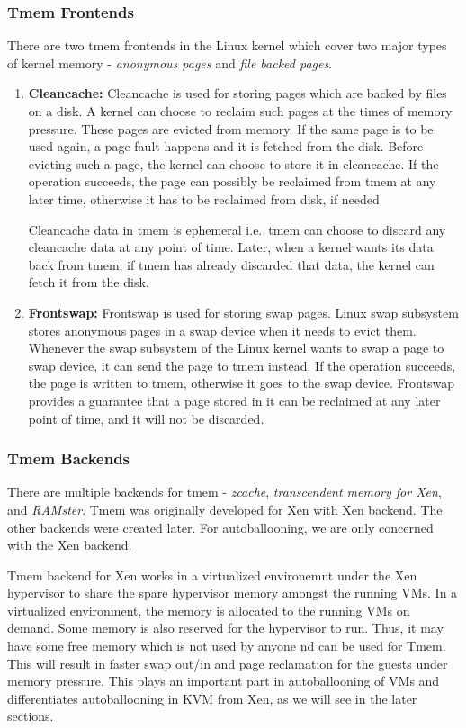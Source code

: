 \subsubsection{Tmem Frontends}
There are two tmem frontends in the Linux kernel which cover two major types of kernel memory - \textit{anonymous pages} and \textit{file backed pages}.
\begin{enumerate}
\item \textbf{Cleancache:} Cleancache is used for storing pages which are backed by files on a disk. A kernel can choose to reclaim such pages at the times of memory pressure. These pages are evicted from memory. If the same page is to be used again, a page fault happens and it is fetched from the disk. Before evicting such a page, the kernel can choose to store it in cleancache. If the operation succeeds, the page can possibly be reclaimed from tmem at any later time, otherwise it has to be reclaimed from disk, if needed

Cleancache data in tmem is ephemeral i.e.\ tmem can choose to discard any cleancache data at any point of time. Later, when a kernel wants its data back from tmem, if tmem has already discarded that data, the kernel can fetch it from the disk.

\item \textbf{Frontswap:} Frontswap is used for storing swap pages. Linux swap subsystem stores anonymous pages in a swap device when it needs to evict them. Whenever the swap subsystem of the Linux kernel wants to swap a page to swap device, it can send the page to tmem instead. If the operation succeeds, the page is written to tmem, otherwise it goes to the swap device. Frontswap provides a guarantee that a page stored in it can be reclaimed at any later point of time, and it will not be discarded.
\end{enumerate}

\subsubsection{Tmem Backends}
There are multiple backends for tmem - \textit{zcache}, \textit{transcendent memory for Xen}, and \textit{RAMster}. Tmem was originally developed for Xen with Xen backend. The other backends were created later. For autoballooning, we are only concerned with the Xen backend.

Tmem backend for Xen works in a virtualized environemnt under the Xen hypervisor to share the spare hypervisor memory amongst the running VMs. In a virtualized environment, the memory is allocated to the running VMs on demand. Some memory is also reserved for the hypervisor to run. Thus, it may have some free memory which is not used by anyone nd can be used for Tmem. This will result in faster swap out/in and page reclamation for the guests under memory pressure. This plays an important part in autoballooning of VMs and differentiates autoballooning in KVM from Xen, as we will see in the later sections.

